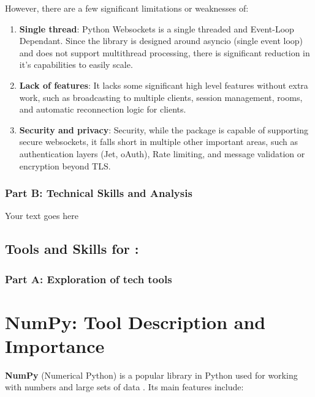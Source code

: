 \documentclass[a4paper, 11pt]{report}
\begin{document}
However, there are a few significant limitations or weaknesses of:

\begin{enumerate}
    \item \textbf{Single thread}: Python Websockets is a single threaded and Event-Loop Dependant. Since the library is designed around asyncio (single event loop) and does not support multithread processing, there is significant reduction in it’s capabilities to easily scale.
    \item \textbf{Lack of  features}: It lacks some significant high level features without extra work, such as broadcasting to multiple clients, session management, rooms, and automatic reconnection logic for clients. 
    \item \textbf{Security and privacy}: Security, while the package is capable of supporting secure websockets, it falls short in multiple other important areas, such as authentication layers (Jet, oAuth), Rate limiting, and message validation or encryption beyond TLS. 
\end{enumerate}


\subsubsection{Part B: Technical Skills and Analysis}

Your text goes here




\subsection{Tools and Skills for \majB: \studB}

\subsubsection{Part A: Exploration of tech tools}

\section*{NumPy: Tool Description and Importance}

\textbf{NumPy} (Numerical Python) is a popular library in Python used for working with numbers and large sets of data \cite{harris2020}. Its main features include:
\end{document}
